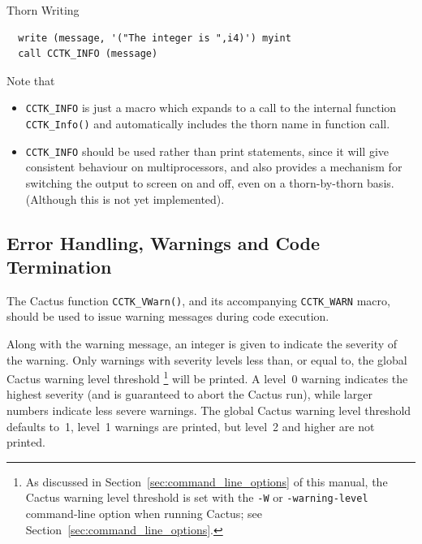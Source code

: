 \begin{cactuspart}{Thorn Writing}
\begin{verbatim}
  write (message, '("The integer is ",i4)') myint
  call CCTK_INFO (message)
\end{verbatim}

Note that
\begin{itemize}
\item{} \texttt{CCTK\_INFO} is just a macro which expands to a call to
        the internal function \texttt{CCTK\_Info()} and automatically includes
        the thorn name in function call.

\item{} \texttt{CCTK\_INFO} should be used rather than print statements,
       since it will give consistent behaviour on multiprocessors, and
       also provides a mechanism for switching the output to screen on
       and off, even on a thorn-by-thorn basis. (Although this is
       not yet implemented).
\end{itemize}


\subsection{Error Handling, Warnings and Code Termination}
\label{sec:erhawancote}
The Cactus function \texttt{CCTK\_VWarn()}, and its accompanying
\texttt{CCTK\_WARN} macro, should be used to issue warning messages
during code execution.

Along with the warning message, an integer is given to indicate the
severity of the warning.  Only warnings with severity levels less
than, or equal to, the global Cactus warning level threshold%
\footnote{%
         As discussed in Section~\ref{sec:command_line_options}
         of this manual, the Cactus warning level threshold is
         set with the \texttt{-W} or \texttt{-warning-level}
         command-line option when running Cactus; see
         Section~\ref{sec:command_line_options}.
         }%
{} will be printed.  A level~0 warning indicates the highest severity
(and is guaranteed to abort the Cactus run), while larger numbers
indicate less severe warnings.  The global Cactus warning level threshold
defaults to~1, \ie{} level~1 warnings are printed, but level~2 and higher
are not printed.


\end{cactuspart}
